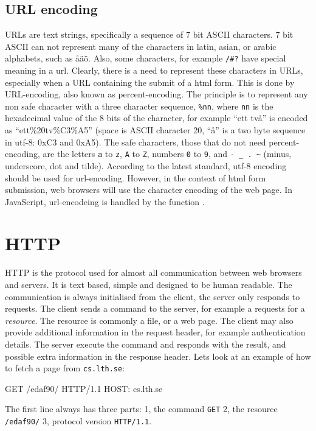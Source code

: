 \subsection{URL encoding} \label{section:http}
URLs are text strings, specifically a sequence of 7 bit ASCII characters. 7 bit ASCII can not represent many of the characters in latin, asian, or arabic alphabets, such as åäö. Also, some characters, for example \texttt{/\#?} have special meaning in a url. Clearly, there is a need to represent these characters in URLs, especially when a URL containing the submit of a html form. This is done by URL-encoding, also known as percent-encoding. The principle is to represent any non safe character with a three character sequence, \texttt{\%nn}, where \texttt{nn} is the hexadecimal value of the 8 bits of the character, for example  ``ett två'' is encoded as ``ett\%20tv\%C3\%A5'' (space is ASCII character 20, ``å'' is a two byte sequence in utf-8: 0xC3 and 0xA5). The safe characters, those that do not need percent-encoding, are the letters \texttt{a} to \texttt{z}, \texttt{A} to \texttt{Z}, numbers \texttt{0} to \texttt{9}, and \texttt{- \_ . \textasciitilde} (minus, underscore, dot and tilde). According to the latest standard, utf-8 encoding should be used for url-encoding. However, in the context of html form submission, web browsers will use the character encoding of the web page. In JavaScript, url-encodeing is handled by the function .
	
\section{HTTP} \label{section:http}
HTTP is the protocol used for almost all communication between web browsers and servers. It is text based, simple and designed to be human readable. The communication is always initialised from the client, the server only responds to requests. The client sends a command to the server, for example a requests for a \emph{resource}. The resource is commonly a file, or a web page. The client may also provide additional information  in the request header, for example authentication details. The server execute the command and responds with the result, and possible extra information in the response header. Lets look at an example of how to fetch a page from \texttt{cs.lth.se}:
\begin{Code}
GET /edaf90/ HTTP/1.1
HOST: cs.lth.se

\end{Code}
The first line always has three parts: 1, the command \texttt{GET} 2, the resource \texttt{/edaf90/} 3, protocol version \texttt{HTTP/1.1}.

